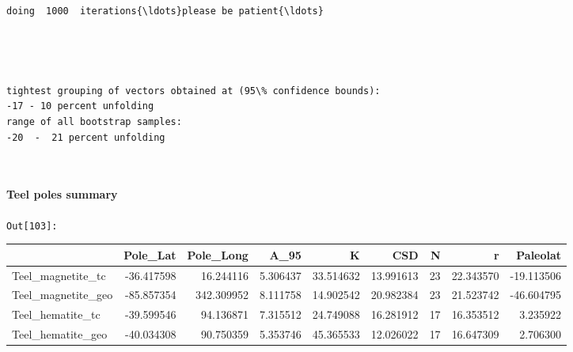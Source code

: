 \documentclass[11pt]{article}
\begin{document}
    \begin{Verbatim}[commandchars=\\\{\}]
doing  1000  iterations{\ldots}please be patient{\ldots}

    \end{Verbatim}

    \begin{center}
    \end{center}
    { \hspace*{\fill} \\}
    
    \begin{center}
    \end{center}
    { \hspace*{\fill} \\}
    
    \begin{Verbatim}[commandchars=\\\{\}]
tightest grouping of vectors obtained at (95\% confidence bounds):
-17 - 10 percent unfolding
range of all bootstrap samples: 
-20  -  21 percent unfolding

    \end{Verbatim}

    \begin{center}
    \end{center}
    { \hspace*{\fill} \\}
    
    \paragraph{Teel poles summary}\label{teel-poles-summary}

\texttt{\color{outcolor}Out[{\color{outcolor}103}]:}
    
    {\tiny\begin{tabular}{lrrrrrrrr}
\toprule
{} &   Pole\_Lat &   Pole\_Long &      A\_95 &          K &        CSD &   N &          r &   Paleolat \\
\midrule
Teel\_magnetite\_tc  & -36.417598 &   16.244116 &  5.306437 &  33.514632 &  13.991613 &  23 &  22.343570 & -19.113506 \\
Teel\_magnetite\_geo & -85.857354 &  342.309952 &  8.111758 &  14.902542 &  20.982384 &  23 &  21.523742 & -46.604795 \\
Teel\_hematite\_tc   & -39.599546 &   94.136871 &  7.315512 &  24.749088 &  16.281912 &  17 &  16.353512 &   3.235922 \\
Teel\_hematite\_geo  & -40.034308 &   90.750359 &  5.353746 &  45.365533 &  12.026022 &  17 &  16.647309 &   2.706300 \\
\bottomrule
\end{tabular}}
    
\end{document}
